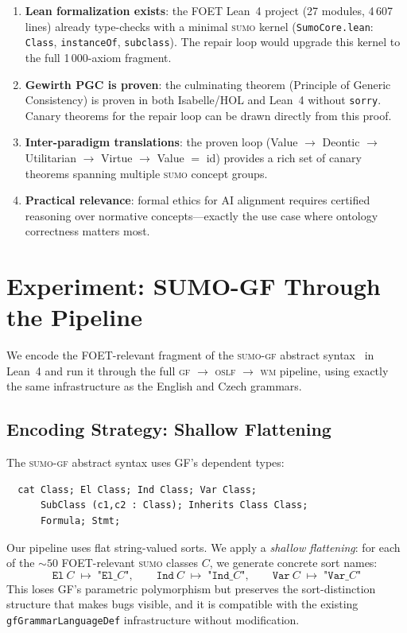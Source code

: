 \documentclass[11pt]{article}
\newcommand{\SUMO}{\textsc{sumo}}
\newcommand{\GF}{\textsc{gf}}
\newcommand{\OSLF}{\textsc{oslf}}
\newcommand{\WM}{\textsc{wm}}
\theoremstyle{definition}
\theoremstyle{plain}
\begin{document}
\begin{enumerate}[nosep]
  \item \textbf{Lean formalization exists}: the FOET Lean~4 project
    (27 modules, 4\,607 lines) already type-checks with a minimal
    \SUMO{} kernel (\texttt{SumoCore.lean}: \texttt{Class},
    \texttt{instanceOf}, \texttt{subclass}).  The repair loop would
    upgrade this kernel to the full 1\,000-axiom fragment.
  \item \textbf{Gewirth PGC is proven}: the culminating theorem
    (Principle of Generic Consistency) is proven in both Isabelle/HOL
    and Lean~4 without \texttt{sorry}.  Canary theorems for the
    repair loop can be drawn directly from this proof.
  \item \textbf{Inter-paradigm translations}: the proven loop
    (Value $\to$ Deontic $\to$ Utilitarian $\to$ Virtue $\to$ Value
    $=$ id) provides a rich set of canary theorems spanning multiple
    \SUMO{} concept groups.
  \item \textbf{Practical relevance}: formal ethics for AI alignment
    requires certified reasoning over normative concepts---exactly the
    use case where ontology correctness matters most.
\end{enumerate}

\section{Experiment: SUMO-GF Through the Pipeline}
\label{app:sumo-gf-experiment}

We encode the FOET-relevant fragment of the \SUMO{}-\GF{} abstract
syntax~\cite{enache2012sumogf} in Lean~4 and run it through the full
\GF{} $\to$ \OSLF{} $\to$ \WM{} pipeline, using exactly the same
infrastructure as the English and Czech grammars.

\subsection{Encoding Strategy: Shallow Flattening}

The \SUMO{}-\GF{} abstract syntax uses GF's dependent types:
\begin{verbatim}
  cat Class; El Class; Ind Class; Var Class;
      SubClass (c1,c2 : Class); Inherits Class Class;
      Formula; Stmt;
\end{verbatim}
Our pipeline uses flat string-valued sorts.  We apply a
\emph{shallow flattening}: for each of the ${\sim}50$ FOET-relevant
\SUMO{} classes $C$, we generate concrete sort names:
\[
  \texttt{El}~C \;\mapsto\; \texttt{"El\_}C\texttt{"},\qquad
  \texttt{Ind}~C \;\mapsto\; \texttt{"Ind\_}C\texttt{"},\qquad
  \texttt{Var}~C \;\mapsto\; \texttt{"Var\_}C\texttt{"}
\]
This loses GF's parametric polymorphism but preserves the
sort-distinction structure that makes bugs visible, and it is
compatible with the existing \texttt{gfGrammarLanguageDef}
infrastructure without modification.
\end{document}
